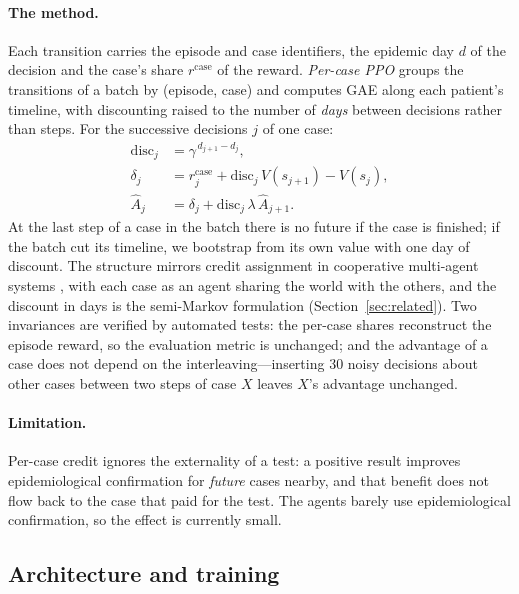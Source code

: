 \documentclass[11pt,a4paper]{article}
\begin{document}
\paragraph{The method.} Each transition carries the episode and case identifiers, the epidemic day $d$ of the decision and the case's share $r^{\text{case}}$ of the reward. \emph{Per-case PPO} groups the transitions of a batch by (episode, case) and computes GAE along each patient's timeline, with discounting raised to the number of \emph{days} between decisions rather than steps. For the successive decisions $j$ of one case:
\begin{align}
\text{disc}_j &= \gamma^{\,d_{j+1} - d_j}, \nonumber\\
\delta_j &= r^{\text{case}}_j + \text{disc}_j \, V(s_{j+1}) - V(s_j), \label{eq:gae_case}\\
\hat A_j &= \delta_j + \text{disc}_j \, \lambda \, \hat A_{j+1}. \nonumber
\end{align}
At the last step of a case in the batch there is no future if the case is finished; if the batch cut its timeline, we bootstrap from its own value with one day of discount. The structure mirrors credit assignment in cooperative multi-agent systems \cite{foerster2018coma, sunehag2018vdn}, with each case as an agent sharing the world with the others, and the discount in days is the semi-Markov formulation \cite{bradtke1995smdp} (Section~\ref{sec:related}). Two invariances are verified by automated tests: the per-case shares reconstruct the episode reward, so the evaluation metric is unchanged; and the advantage of a case does not depend on the interleaving---inserting 30 noisy decisions about other cases between two steps of case $X$ leaves $X$'s advantage unchanged.

\paragraph{Limitation.} Per-case credit ignores the externality of a test: a positive result improves epidemiological confirmation for \emph{future} cases nearby, and that benefit does not flow back to the case that paid for the test. The agents barely use epidemiological confirmation, so the effect is currently small.

\subsection{Architecture and training}
\label{subsec:training}
\end{document}
